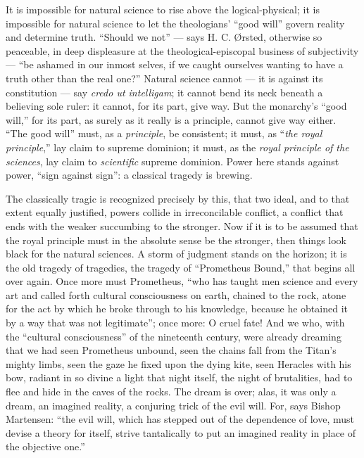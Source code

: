 \documentclass[12pt]{book}
\newcommand{\opage}[1]{\marginnote{\footnotesize\textit{[#1]}}}
\begin{document}
It is impossible for natural science to rise above the logical-physical; it is impossible for natural science to let the theologians' ``good will'' govern reality and determine truth. ``Should we not'' --- says H. C. Ørsted, otherwise so peaceable, in deep displeasure at the theological-episcopal business of subjectivity --- ``be ashamed in our inmost selves, if we caught ourselves wanting to have a truth other than the real one?'' Natural science cannot --- it is against its constitution --- say \textit{credo ut intelligam}; it cannot bend its neck beneath a believing sole ruler: it cannot, for its part, give way. But the monarchy's ``good will,'' for its part, as surely as it really is a principle, cannot give way either. ``The good will'' must, as a \emph{principle}, be consistent; it must, as ``\emph{the royal principle},'' lay claim to supreme dominion; it must, as the \emph{royal principle of the sciences}, lay claim to \emph{scientific} supreme dominion. Power here stands against power, ``sign against sign'': a classical tragedy is brewing.

The classically tragic is recognized precisely by this, that two ideal, and to that extent equally justified, powers collide in irreconcilable conflict, a conflict that ends with the weaker succumbing to the stronger. Now if it is to be assumed that the royal principle must in the absolute sense be the stronger, then things look black for the natural sciences. A storm of judgment stands on the horizon; it is the old tragedy of tragedies, the tragedy of ``Prometheus Bound,'' that begins all over again. Once more must Prometheus, ``who has taught men science and every art and called forth
\opage{17}\setcounter{footnote}{0}%
cultural consciousness on earth, chained to the rock, atone for the act by which he broke through to his knowledge, because he obtained it by a way that was not legitimate'';
once more: O cruel fate! And we who, with the ``cultural consciousness'' of the nineteenth century, were already dreaming that we had seen Prometheus unbound, seen the chains fall from the Titan's mighty limbs, seen the gaze he fixed upon the dying kite, seen Heracles with his bow, radiant in so divine a light that night itself, the night of brutalities, had to flee and hide in the caves of the rocks. The dream is over; alas, it was only a dream, an imagined reality, a conjuring trick of the evil will. For, says Bishop Martensen: ``the evil will, which has stepped out of the dependence of love, must devise a theory for itself, strive tantalically to put an imagined reality in place of the objective one.''
\end{document}
